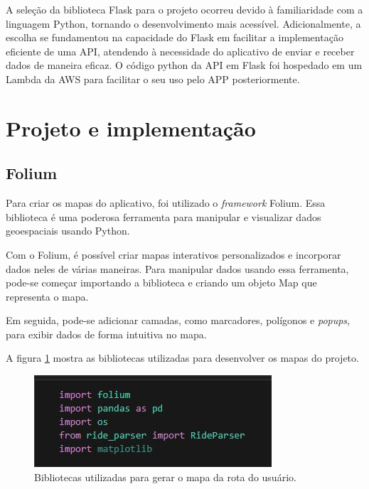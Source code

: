     A seleção da biblioteca Flask para o projeto ocorreu devido à familiaridade com a linguagem Python, tornando o desenvolvimento mais acessível. Adicionalmente, a escolha se fundamentou na capacidade do Flask em facilitar a implementação eficiente de uma API, atendendo à necessidade do aplicativo de enviar e receber dados de maneira eficaz. O código python da API em Flask foi hospedado em um Lambda da AWS para facilitar o seu uso pelo APP posteriormente.


\section{Projeto e implementação}

\subsection{Folium}
    Para criar os mapas do aplicativo, foi utilizado o \textit{framework} Folium. Essa biblioteca é uma poderosa ferramenta para manipular e visualizar dados geoespaciais usando Python. 
    
    Com o Folium, é possível criar mapas interativos personalizados e incorporar dados neles de várias maneiras. Para manipular dados usando essa ferramenta, pode-se começar importando a biblioteca e criando um objeto Map que representa o mapa. 
    
    Em seguida, pode-se adicionar camadas, como marcadores, polígonos e \textit{popups}, para exibir dados de forma intuitiva no mapa. 
    
    
    A figura 
    \ref{fig:python_libs} mostra as bibliotecas utilizadas para desenvolver os mapas do projeto.
    
    \begin{figure}[hp]
        \centering
        
        \includegraphics[scale=0.8]{figures/bibliotecas.jpg}
        
        \caption{Bibliotecas utilizadas para gerar o mapa da rota do usuário.}
        
        \label{fig:python_libs}
    \end{figure}
    

